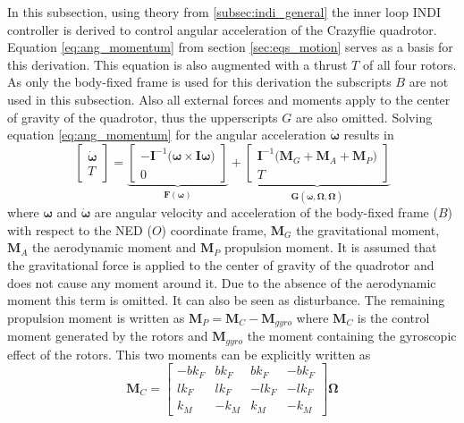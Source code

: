 \documentclass[11pt, a4paper, twoside]{report}
\begin{document}
In this subsection, using theory from \ref{subsec:indi_general} the inner loop \acrshort{INDI} controller is derived to control angular acceleration of the Crazyflie quadrotor. Equation \ref{eq:ang_momentum} from section \ref{sec:eqs_motion} serves as a basis for this derivation. This equation is also augmented with a thrust $T$ of all four rotors. As only the body-fixed frame is used for this derivation the subscripts $B$ are not used in this subsection. Also all external forces and moments apply to the center of gravity of the quadrotor, thus the upperscripts $G$ are also omitted. 
Solving equation \ref{eq:ang_momentum} for the angular acceleration $\dot{\bm{\omega}}$ results in
\begin{equation}
	\begin{bmatrix}
		\dot{\bm{\omega}}\\
		T
	\end{bmatrix} = 
	\underbrace{
	\begin{bmatrix}
		-\bm{I}^{-1} \big(\bm{\omega} \times \bm{I} \bm{\omega} \big)\\
		0
	\end{bmatrix}}_\text{$\bm{F}(\bm{\omega})$} +
	\underbrace{	
	\begin{bmatrix}
		\bm{I}^{-1} \big( \bm{M}_G + \bm{M}_{A} +  \bm{M}_{P} \big)\\
		T
	\end{bmatrix}}_\text{$\bm{G}(\bm{\omega}, \bm{\Omega}, \bm{\dot{\Omega}})$}
	\label{eq:main_eom_indi_inner}
\end{equation}
where $\bm{\omega}$ and $\dot{\bm{\omega}}$ are angular velocity and acceleration of the body-fixed frame ($B$) with respect to the \acrshort{NED} ($O$) coordinate frame, $\bm{M}_G$ the gravitational moment, $\bm{M}_A$ the aerodynamic moment and $\bm{M}_P$ propulsion moment. It is assumed that the gravitational force is applied to the center of gravity of the quadrotor and does not cause any moment around it. Due to the absence of the aerodynamic moment this term is omitted. It can also be seen as disturbance. The remaining propulsion moment is written as $\bm{M}_P=\bm{M}_C-\bm{M}_{gyro}$ where $\bm{M}_C$ is the control moment generated by the rotors and $\bm{M}_{gyro}$ the moment containing the gyroscopic effect of the rotors. This two moments can be explicitly written as
\begin{equation}
	\bm{M}_C = 	
	\begin{bmatrix}
		-bk_F & bk_F & bk_F & -bk_F \\
		lk_F & lk_F & -lk_F & -lk_F \\
		k_M & -k_M & k_M & -k_M 
	\end{bmatrix} \bm{\Omega}
	\label{eq:m_c}
\end{equation}
\end{document}
